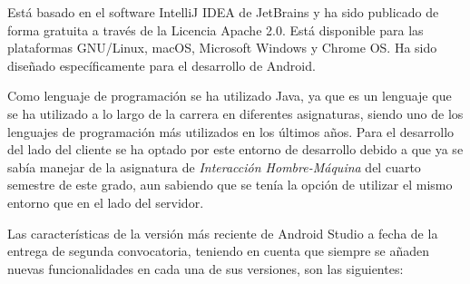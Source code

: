 Está basado en el software IntelliJ IDEA de JetBrains y ha sido publicado de
forma gratuita a través de la Licencia Apache 2.0. Está disponible para las
plataformas GNU/Linux, macOS, Microsoft Windows y Chrome OS. Ha sido diseñado
específicamente para el desarrollo de Android.

Como lenguaje de programación se ha utilizado Java, ya que es un lenguaje que se
ha utilizado a lo largo de la carrera en diferentes asignaturas, siendo uno de
los lenguajes de programación más utilizados en los últimos años. Para el
desarrollo del lado del cliente se ha optado por este entorno de desarrollo
debido a que ya se sabía manejar de la asignatura de \textit{Interacción
Hombre-Máquina} del cuarto semestre de este grado, aun sabiendo que se tenía la
opción de utilizar el mismo entorno que en el lado del servidor. 

Las características de la versión más reciente de Android Studio a fecha de la
entrega de segunda convocatoria, teniendo en cuenta que siempre se añaden nuevas
funcionalidades en cada una de sus versiones, son las siguientes:\cite{AndroidStudioWiki}


